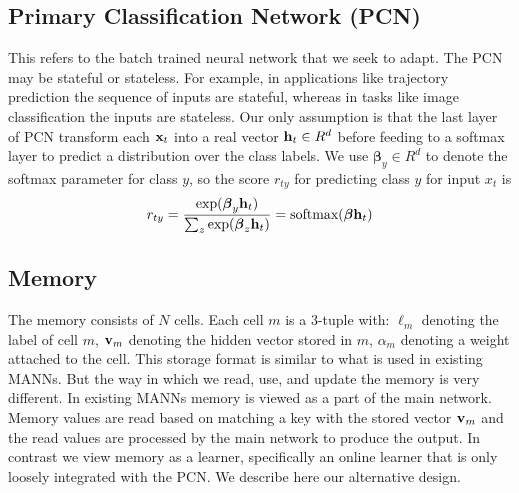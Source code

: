 \documentclass[letterpaper]{article} %
\newcommand{\vek}[1]{{\bf {#1}}}
\newcommand{\vx}{{\vek{x}}}
\newcommand{\vh}{{\vek{h}}}
\newcommand{\vM}{{\vek{v}}}
\newcommand{\util}{{\alpha}}
\newcommand{\vbeta}{{\boldsymbol{\beta}}}
\begin{document}
\subsection{Primary Classification Network (PCN)}
This refers to the batch trained neural network that we seek to adapt. 
The PCN may be stateful or stateless.  For example, in applications like trajectory prediction the sequence of inputs are stateful, whereas in tasks like image classification the inputs are stateless. 
Our only assumption is that the last layer of PCN transform each $\vx_t$ into a real vector $\vh_t \in R^d$ before feeding to a softmax layer to predict a distribution over the class labels.  
We use $\vbeta_y \in R^d$ to denote the softmax parameter for class $y$, so the score  $r_{ty}$ for predicting class $y$ for input $x_t$ is
%
\begin{equation}
\label{eq-pcn}
\begin{split}
 r_{ty} = \frac{\exp(\vbeta_y \vh_t)}{\sum_{z}\exp(\vbeta_z \vh_t)} = \text{softmax}(\vbeta \vh_t)
 \end{split}
\end{equation}
%


\subsection{Memory}
The memory consists of $N$ cells. Each cell $m$  is a 3-tuple with:
$\ell_m$ denoting the label of cell $m$,
$\vM_m$ denoting the hidden vector stored in $m$,
$\util_m$ denoting a weight attached to the cell.  This storage format is similar to what is used in existing MANNs.  But the way in which we read, use, and update the memory is very different.  In existing MANNs memory is viewed as a part of the main network.  Memory values are read based on matching a key with the stored vector $\vM_m$ and the read values are processed by the main network to produce the output.  In contrast we view memory as a learner, specifically an online learner that is only loosely integrated with the PCN. We describe here our alternative design.
\end{document}
